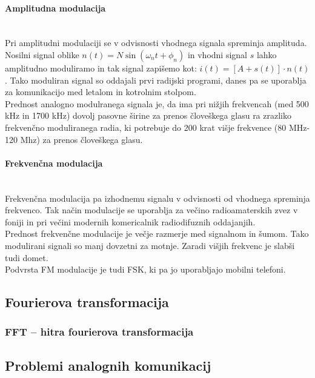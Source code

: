 \documentclass[12pt]{article}
\begin{document}
            \paragraph{Amplitudna modulacija} \mbox{}\\ 
                Pri amplitudni modulaciji se v odvisnosti vhodnega signala 
                spreminja amplituda. 
                Nosilni signal oblike $n(t) = N\sin(\omega_{n} t + \phi_{n})$ in 
                vhodni signal $s$ lahko amplitudno moduliramo in tak signal 
                zapišemo kot: $i(t) = [A + s(t)]\cdot n(t)$. Tako moduliran 
                signal so oddajali prvi radijski programi, danes pa se
		uporablja za komunikacijo med letalom in kotrolnim stolpom.\\
                Prednost analogno modulranega signala je, da ima pri nižjih
		frekvencah (med 500 kHz in 1700 kHz) dovolj pasovne širine za 
		prenos človeškega glasu ra zrazliko frekvenčno moduliranega
		radia, ki potrebuje do 200 krat višje frekvence (80 MHz-120 Mhz)
		za prenos človeškega glasu.
            \paragraph{Frekvenčna modulacija} \mbox{}\\
            	Frekvenčna modulacija pa izhodnemu signalu v odvisnosti od 
		vhodnega spreminja frekvenco. Tak način modulacije se uporablja
		za večino radioamaterskih zvez v foniji in pri večini modernih
		komericalnik radiodifuznih oddajanjih.\\
		Prednost frekvenčne modulacije je večje razmerje med signalnom
		in šumom. Tako modulirani signali so manj dovzetni za motnje.
		Zaradi višjih frekvenc je slabši tudi domet.\\
		Podvrsta FM modulacije je tudi FSK, ki pa jo uporabljajo mobilni
		telefoni. \cite{wendover_fsk}

    \newpage
    \subsection{Fourierova transformacija}
        \subsubsection{FFT – hitra fourierova transformacija}
    \subsection{Problemi analognih komunikacij}
\end{document}
